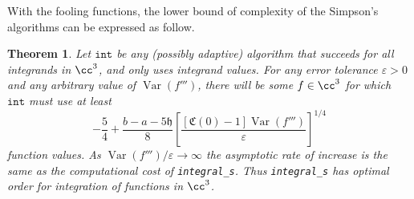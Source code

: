 \documentclass{iitthesis}
\DeclareMathOperator{\Var}{Var}
\newtheorem{theorem}{Theorem}
\theoremstyle{definition}
\theoremstyle{remark}
\begin{document}
With the fooling functions, the lower bound of complexity of the Simpson's algorithms can be expressed as follow.
\begin{theorem}\label{compsim}
    Let $\texttt{int}$ be any (possibly adaptive) algorithm that succeeds for all integrands in $\cc^3$, and only uses integrand values. For any error tolerance $\varepsilon > 0$ and any arbitrary value of $\Var(f''')$, there will be some $f\in \cc^3$ for which $\texttt{int}$ must use at least
    \begin{equation}\label{complowbdsim}
        -\frac{5}{4}+\frac{b-a-5\mathfrak{h}}{8}\left[\frac{[\mathfrak{C}(0)-1]\Var( f''')}{\varepsilon}\right]^{1/4}
    \end{equation}
    function values. As $\Var(f''')/\varepsilon \rightarrow \infty$ the asymptotic rate of increase is the same as the computational cost of {\tt integral\_s}. Thus {\tt integral\_s} has optimal order for integration of functions in $\cc^3$.
\end{theorem}
\end{document}
